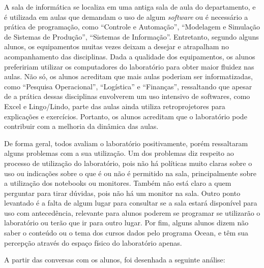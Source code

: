 A sala de informática se localiza em uma antiga sala de aula do departamento, e é utilizada em aulas que demandam o uso de algum \textit{software} ou é necessário a prática de programação, como \enquote{Controle e Automação}, \enquote{Modelagem e Simulação de Sistemas de Produção}, \enquote{Sistemas de Informação}. Entretanto, segundo alguns alunos, os equipamentos muitas vezes deixam a desejar e atrapalham no acompanhamento das disciplinas. Dada a qualidade dos equipamentos, os alunos prefeririam utilizar os computadores do laboratório para obter maior fluidez nas aulas. Não só, os alunos acreditam que mais aulas poderiam ser informatizadas, como \enquote{Pesquisa Operacional}, \enquote{Logística} e \enquote{Finanças}, ressaltando que apesar de a prática dessas disciplinas envolverem um uso intensivo de softwares, como Excel e Lingo/Lindo, parte das aulas ainda utiliza retroprojetores para explicações e exercícios. Portanto, os alunos acreditam que o laboratório pode contribuir com a melhoria da dinâmica das aulas.

De forma geral, todos avaliam o laboratório positivamente, porém ressaltaram alguns problemas com a sua utilização. Um dos problemas diz respeito ao processo de utilização do laboratório, pois não há políticas muito claras sobre o uso ou indicações sobre o que é ou não é permitido na sala, principalmente sobre a utilização dos notebooks ou monitores. Também não está claro a quem perguntar para tirar dúvidas, pois não há um monitor na sala. Outro ponto levantado é a falta de algum lugar para consultar se a sala estará disponível para uso com antecedência, relevante para alunos poderem se programar se utilizarão o laboratório ou terão que ir para outro lugar. Por fim, alguns alunos dizem não saber o conteúdo ou o tema dos cursos dados pelo programa Ocean, e têm sua percepção através do espaço físico do laboratório apenas. 

A partir das conversas com os alunos, foi desenhada a seguinte análise:

